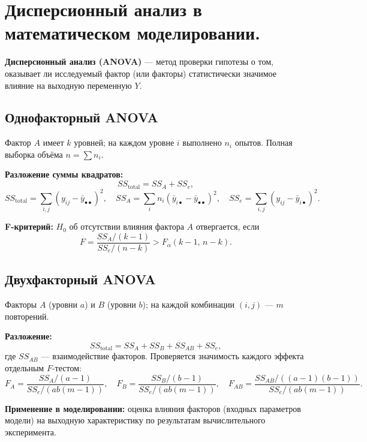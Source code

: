 \section{Дисперсионный анализ в математическом моделировании.}

\textbf{Дисперсионный анализ (ANOVA)} — метод проверки гипотезы о том, оказывает ли исследуемый фактор (или факторы) статистически значимое влияние на выходную переменную $Y$.

\subsection*{Однофакторный ANOVA}

Фактор $A$ имеет $k$ уровней; на каждом уровне $i$ выполнено $n_i$ опытов. Полная выборка объёма $n = \sum n_i$.

\textbf{Разложение суммы квадратов:}
\[
  SS_{\text{total}} = SS_A + SS_e,
\]
\[
  SS_{\text{total}} = \sum_{i,j}(y_{ij} - \bar{y}_{\bullet\bullet})^2, \quad
  SS_A = \sum_i n_i (\bar{y}_{i\bullet} - \bar{y}_{\bullet\bullet})^2, \quad
  SS_e = \sum_{i,j}(y_{ij} - \bar{y}_{i\bullet})^2.
\]

\textbf{F-критерий:} $H_0$ об отсутствии влияния фактора $A$ отвергается, если
\[
  F = \frac{SS_A/(k-1)}{SS_e/(n-k)} > F_\alpha(k-1,\,n-k).
\]

\subsection*{Двухфакторный ANOVA}

Факторы $A$ (уровни $a$) и $B$ (уровни $b$); на каждой комбинации $(i,j)$ — $m$ повторений.

\textbf{Разложение:}
\[
  SS_{\text{total}} = SS_A + SS_B + SS_{AB} + SS_e,
\]
где $SS_{AB}$ — взаимодействие факторов. Проверяется значимость каждого эффекта отдельным $F$-тестом:
\[
  F_A = \frac{SS_A/(a-1)}{SS_e/(ab(m-1))}, \quad F_B = \frac{SS_B/(b-1)}{SS_e/(ab(m-1))}, \quad F_{AB} = \frac{SS_{AB}/((a-1)(b-1))}{SS_e/(ab(m-1))}.
\]

\textbf{Применение в моделировании:} оценка влияния факторов (входных параметров модели) на выходную характеристику по результатам вычислительного эксперимента.

\clearpage

